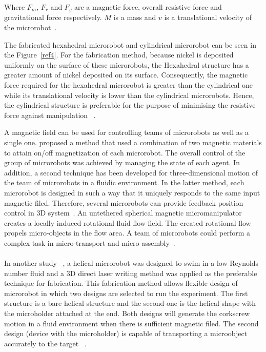 \documentclass[a4paper,11pt]{article}
\begin{document}
\begin{sloppypar}
Where $F_m$, $F_r$ and $F_g$ are a magnetic force, overall resistive force and gravitational force respectively. 
$M$ is a mass and $v$ is a translational velocity of the microrobot~\citep{kim2013fabrication}.  



The fabricated hexahedral microrobot and cylindrical microrobot can be seen in the Figure~\ref{ref4}.
 For the fabrication method, because  nickel is deposited uniformly on the surface of these microrobots, the 
Hexahedral structure has a greater amount of nickel deposited on its surface. Consequently, the 
magnetic force required for the hexahedral microrobot is greater than the cylindrical one while its 
translational velocity is lower than the cylindrical microrobots. Hence, the cylindrical structure is preferable
 for the purpose of minimising the resistive force against manipulation ~\citep{kim2013fabrication}. 

A magnetic field can be used for controlling teams of microrobots as well as a single 
one. \citeauthor{kim2013fabrication} proposed a method that used a combination of two magnetic materials to 
attain on/off magnetization of each microrobot. The overall control of the group of microrobots 
was achieved by managing the state of each agent. In addition, a second technique has been 
developed for three-dimensional motion of the team of microrobots in a fluidic environment. In
 the latter method, each microrobot is designed in such a way that it uniquely responds to the 
same input magnetic filed. Therefore, several microrobots can provide feedback position control in 
3D system~\citep{kim2013fabrication}.
An untethered spherical magnetic micromanipulator creates a locally induced rotational fluid flow field. 
The created rotational flow propels micro-objects in the flow area. A team of microrobots could perform
 a complex task in micro-transport and micro-assembly~\citep{kim2013fabrication}.

\paragraph{}
In another study ~\citep{tottori2012magnetic}, a helical microrobot was designed to swim in a low Reynolds number fluid and a 3D 
direct laser writing method was applied as the preferable technique for fabrication. This fabrication 
method allows flexible design of microrobot in which two designs are selected to run the experiment. 
The first structure is a bare helical structure and the second one is the
 helical shape with the microholder attached at the end. Both designs will generate the corkscrew
 motion in a fluid environment when there is sufficient magnetic filed. The second 
design (device with the microholder) is capable of transporting a microobject accurately to the 
target ~\citep{tottori2012magnetic}.



\end{sloppypar}
\end{document}
